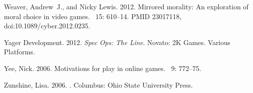 \documentclass[arts,article,accept,moreauthors,pdftex,10pt,a4paper]{Definitions/mdpi}
\begin{document}
\begin{thebibliography}{999}
Weaver, Andrew~J., and Nicky Lewis. 2012.
\newblock Mirrored morality: An exploration of moral choice in video games.
~{15\/}: 610--14.
\newblock PMID 23017118,
  doi:10.1089/cyber.2012.0235.

{Yager Development}. 2012.
\newblock \emph{Spec Ops: The Line}.
\newblock Novato: 2K Games.
\newblock Various Platforms.


Yee, Nick. 2006.
\newblock Motivations for play in online games.
~{9\/}: 772--75.

Zunshine, Lisa. 2006.
.
\newblock Columbus: Ohio State University Press.

\end{thebibliography}

\end{document}
